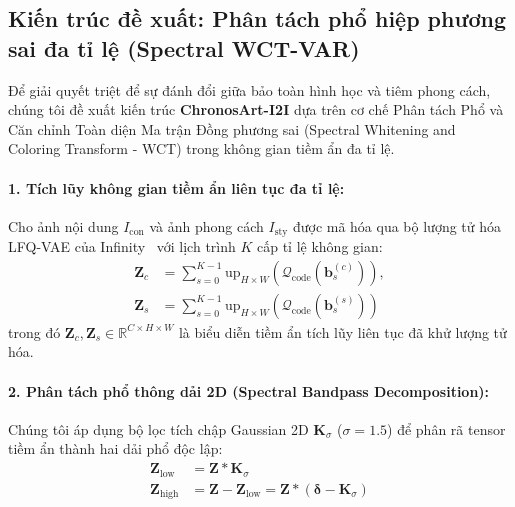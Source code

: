 \documentclass[10pt,twocolumn,letterpaper]{article}
\begin{document}
\subsection{Kiến trúc đề xuất: Phân tách phổ hiệp phương sai đa tỉ lệ (Spectral WCT-VAR)}
Để giải quyết triệt để sự đánh đổi giữa bảo toàn hình học và tiêm phong cách, chúng tôi đề xuất kiến trúc \textbf{ChronosArt-I2I} dựa trên cơ chế Phân tách Phổ và Căn chỉnh Toàn diện Ma trận Đồng phương sai (Spectral Whitening and Coloring Transform - WCT) trong không gian tiềm ẩn đa tỉ lệ.

\paragraph{1. Tích lũy không gian tiềm ẩn liên tục đa tỉ lệ:}
Cho ảnh nội dung $I_{\text{con}}$ và ảnh phong cách $I_{\text{sty}}$ được mã hóa qua bộ lượng tử hóa LFQ-VAE của Infinity~\cite{han2025infinity} với lịch trình $K$ cấp tỉ lệ không gian:
\begin{align}
\mathbf{Z}_c &= \sum_{s=0}^{K-1} \text{up}_{H \times W} \left( \mathcal{Q}_{\text{code}}(\mathbf{b}_s^{(c)}) \right), \\
\mathbf{Z}_s &= \sum_{s=0}^{K-1} \text{up}_{H \times W} \left( \mathcal{Q}_{\text{code}}(\mathbf{b}_s^{(s)}) \right)
\end{align}
trong đó $\mathbf{Z}_c, \mathbf{Z}_s \in \mathbb{R}^{C \times H \times W}$ là biểu diễn tiềm ẩn tích lũy liên tục đã khử lượng tử hóa.

\paragraph{2. Phân tách phổ thông dải 2D (Spectral Bandpass Decomposition):}
Chúng tôi áp dụng bộ lọc tích chập Gaussian 2D $\mathbf{K}_\sigma$ ($\sigma = 1.5$) để phân rã tensor tiềm ẩn thành hai dải phổ độc lập:
\begin{align}
\mathbf{Z}_{\text{low}} &= \mathbf{Z} * \mathbf{K}_\sigma \\
\mathbf{Z}_{\text{high}} &= \mathbf{Z} - \mathbf{Z}_{\text{low}} = \mathbf{Z} * (\boldsymbol{\delta} - \mathbf{K}_\sigma)
\end{align}
\end{document}
